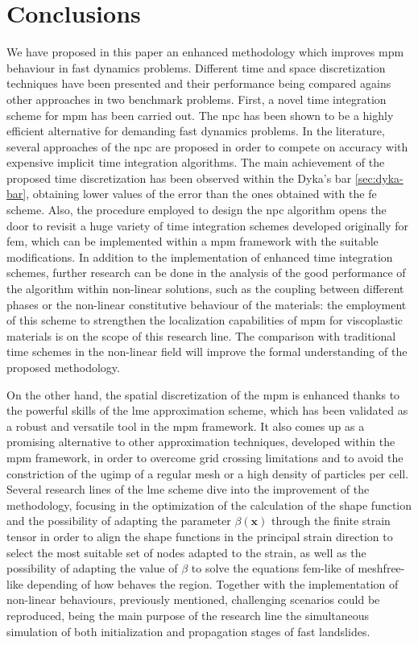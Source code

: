 \documentclass[preprint,12pt,a4paper]{elsarticle}
\newcommand{\vect}[1]{
  \ensuremath{\mathbf{{#1}}}
}
\begin{document}
\section{Conclusions}
\label{sec:conclusions}
We have proposed in this paper an enhanced methodology which improves \acrfull{mpm} behaviour in fast dynamics problems. Different time and space discretization techniques have been presented and their performance being compared agains other approaches in two benchmark problems.
First, a novel time integration scheme for
\acrshort{mpm} has been carried out. The \acrshort{npc} has been
  shown to be a highly efficient alternative for demanding fast dynamics problems. In the literature, several approaches of the \acrshort{npc} are proposed in order to compete on accuracy with expensive implicit time integration algorithms. The main achievement of the proposed time discretization has been observed within the Dyka's bar \ref{sec:dyka-bar}, obtaining lower values of the error than the ones obtained with the \acrfull{fe} scheme.
Also, the procedure employed to design the \acrshort{npc} algorithm opens the
door to revisit a huge variety of time integration schemes developed
originally for \acrshort{fem}, which can be implemented within a
  \acrshort{mpm} framework with the suitable modifications. In
addition to the implementation of enhanced time integration schemes, further
research can be done in the analysis of the good performance of the algorithm within non-linear solutions, such as the coupling between different phases or the non-linear constitutive behaviour of the materials: the employment of this scheme to strengthen the localization capabilities of \acrshort{mpm} for viscoplastic materials is on the scope of this research line. The comparison with traditional time schemes in the non-linear field will improve the formal understanding of the proposed methodology.

On the other hand, the spatial discretization of the \acrshort{mpm} is enhanced thanks to the powerful skills of the \acrfull{lme} approximation scheme, which has been validated as a robust and versatile
tool in the \acrshort{mpm} framework. It also comes up as a promising
alternative to other approximation techniques, developed within the
\acrshort{mpm} framework, in order to overcome grid crossing limitations and to avoid the
constriction of the \acrshort{ugimp} of a regular mesh or a high
density of particles per cell. Several research lines of the \acrshort{lme} scheme dive into the improvement of the methodology, focusing in the optimization of the calculation of the shape function and the possibility of adapting the parameter $\beta(\vect{x})$ through the finite strain
tensor in order to align the shape functions in the principal strain
direction to select the most suitable set of nodes adapted to the strain, as well as the possibility of adapting the value of $\beta$ to solve the equations
\acrshort{fem}-like of meshfree-like depending of how behaves the
region. Together with the implementation of non-linear behaviours, previously mentioned, challenging
scenarios could be reproduced, being the main purpose of the research line the simultaneous simulation of both initialization and
propagation stages of fast landslides.
\end{document}
